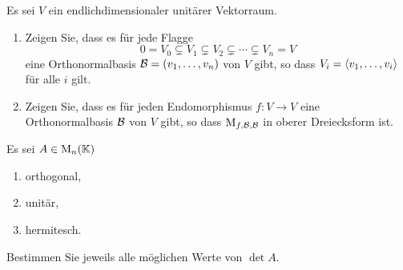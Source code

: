 \documentclass[a4paper, 10pt]{scrartcl}
\begin{document}
\begin{question}
  Es sei $V$ ein endlichdimensionaler unitärer Vektorraum.
  \begin{enumerate}
    \item
      Zeigen Sie, dass es für jede Flagge
      \[
                    0
        =           V_0
        \subsetneq  V_1
        \subsetneq  V_2
        \subsetneq  \dotsb
        \subsetneq  V_n
        =           V
      \]
      eine Orthonormalbasis $\mathcal{B} = (v_1, \dotsc, v_n)$ von $V$ gibt, so dass $V_i = \left\langle v_1, \dotsc, v_i \right\rangle$ für alle $i$ gilt.
    \item
      Zeigen Sie, dass es für jeden Endomorphismus $f \colon V \to V$ eine Orthonormalbasis $\mathcal{B}$ von $V$ gibt, so dass $\operatorname{M}_{f, \mathcal{B}, \mathcal{B}}$ in oberer Dreiecksform ist.
  \end{enumerate}
\end{question}





\begin{question}
  Es sei $A \in \operatorname{M}_{n}(\mathbb{K})$
  \begin{enumerate}
    \item
      orthogonal,
    \item
      unitär,
    \item
      hermitesch.
  \end{enumerate}
  Bestimmen Sie jeweils alle möglichen Werte von $\det A$.
\end{question}
\end{document}
